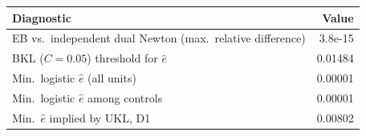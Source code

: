 \begin{tabular}{lr}
\hline
Diagnostic & Value \\
\hline
EB vs.\ independent dual Newton (max.\ relative difference) & 3.8e-15 \\
BKL ($C=0.05$) threshold for $\widehat e$ & 0.01484 \\
Min.\ logistic $\widehat e$ (all units) & 0.00001 \\
Min.\ logistic $\widehat e$ among controls & 0.00001 \\
Min.\ $\widehat e$ implied by UKL, D1 & 0.00802 \\
\hline
\end{tabular}
